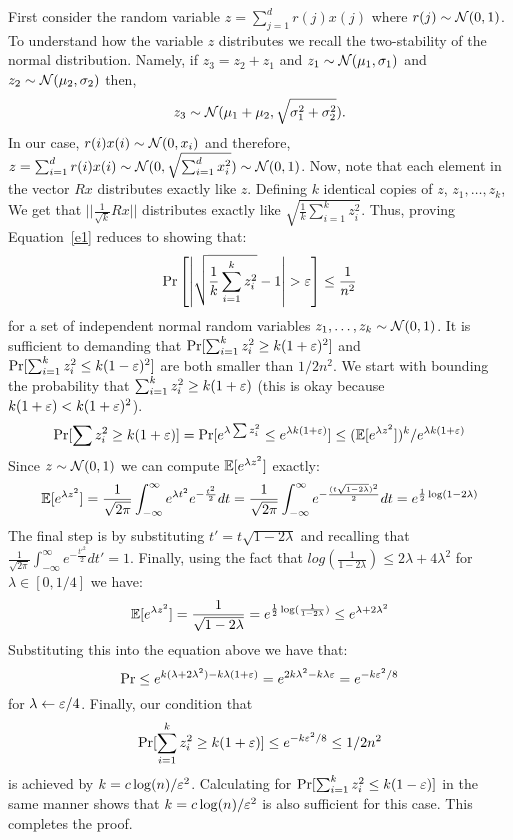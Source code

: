\documentclass{article}
\begin{document}
First consider the random variable $z = \sum_{j=1}^{d}r(j)x(j)$ where $r(j) \sim {\mathcal{N}}(0,1)$. 
To understand how the variable $z$ distributes we recall the two-stability of the
normal distribution. Namely, if $z_3 = z_2 + z_1$ and 
$z_1 \sim {\mathcal{N}}(\mu_1,\sigma_{1})$ and $z_2 \sim {\mathcal{N}}(\mu_2,\sigma_{2})$ then, $$z_3 \sim {\mathcal{N}}(\mu_1 + \mu_2,\sqrt{\sigma^{2}_{1} + \sigma^{2}_{2}}).$$
In our case,  $r(i)x(i) \sim {\mathcal{N}}(0,x_{i})$ and therefore, $z = \sum_{i=1}^{d}r(i)x(i) \sim {\mathcal{N}}(0,\sqrt{\sum_{i=1}^{d}x^{2}_{i}}) \sim {\mathcal{N}}(0,1)$.
%
Now, note that each element in the vector $Rx$ distributes exactly like $z$.
Defining $k$ identical copies of $z$, $z_1,\ldots,z_k$,
We get that $||\frac{1}{\sqrt{k}}Rx||$ distributes exactly like $\sqrt{\frac{1}{k}\sum_{i=1}^{k} z^{2}_{i}}$.
Thus, proving Equation~\ref{e1} reduces to showing that:
\begin{equation}
\Pr\left[ \left| \sqrt{\frac{1}{k}\sum_{i=1}^{k} z^{2}_{i}} - 1 \right| > \varepsilon \right] \le \frac{1}{n^2} 
\end{equation}
for a set of independent normal random variables $z_1,\ldots,z_k \sim {\mathcal{N}}(0,1)$.
It is sufficient to demanding that $\Pr[\sum_{i=1}^{k} z^{2}_{i} \ge k(1+\varepsilon)^2]$ and $\Pr[\sum_{i=1}^{k} z^{2}_{i} \le k(1-\varepsilon)^2]$ are both smaller than $1/2n^2$.
We start with bounding the probability that $\sum_{i=1}^{k} z^{2}_{i} \ge k(1+\varepsilon)$ (this is okay because $k(1+\varepsilon) < k(1+\varepsilon)^2$).
\[
\Pr[\sum z^{2}_{i} \ge k(1+\varepsilon)] = \Pr[e^{\lambda \sum z^{2}_{i}} \le e^{\lambda k (1+\varepsilon)}] \le ({\mathbb E}[e^{\lambda z^2}])^k/e^{\lambda k (1+\varepsilon)}
\]
Since $z \sim {\mathcal{N}}(0,1)$ we can compute ${\mathbb E}[e^{\lambda z^2}]$ exactly:
\[
{\mathbb E} [e^{\lambda z^{2}}] = \frac{1}{\sqrt{2\pi}}\int_{-\infty}^{\infty} e^{\lambda t^{2}} e^{-\frac{t^{2}}{2}} dt =\frac{1}{\sqrt{2\pi}}\int_{-\infty}^{\infty} e^{-\frac{(t\sqrt{1-2\lambda})^{2}}{2}}dt = e^{\frac{1}{2} \log(1-2\lambda)}
\]
The final step is by substituting $t' = t\sqrt{1-2\lambda}$ and recalling that $\frac{1}{\sqrt{2\pi}}\int_{-\infty}^{\infty} e^{-\frac{t'^{2}}{2}}dt' = 1$.
Finally, using the fact that $log(\frac{1}{1-2\lambda}) \le 2\lambda + 4\lambda^2$ for $\lambda \in [0,1/4]$ we have:
\[
{\mathbb E} [e^{\lambda z^{2}}] = \frac{1}{\sqrt{1-2\lambda}} = e^{\frac{1}{2} \log(\frac{1}{1-2\lambda})} \le e^{\lambda + 2\lambda^2}
\]
Substituting this into the equation above we have that:
\[
\Pr \le e^{k(\lambda  + 2\lambda^2) - k\lambda (1+\varepsilon)} = e^{ 2k\lambda^2 - k\lambda\varepsilon}  = e^{ - k\varepsilon^2/8}  
\]
for $\lambda \leftarrow \varepsilon/4$. Finally, our condition that 
\[
\Pr[\sum_{i=1}^{k} z^{2}_{i} \ge k(1+\varepsilon)] \le e^{ - k\varepsilon^2/8} \le 1/2n^2
\]
is achieved by $k = c\log(n)/\varepsilon^2$.
Calculating for $\Pr[\sum_{i=1}^{k} z^{2}_{i} \le k(1-\varepsilon)]$ in the same manner shows that $k = c\log(n)/\varepsilon^2$ is also sufficient for this case.
This completes the proof.




\end{document}
